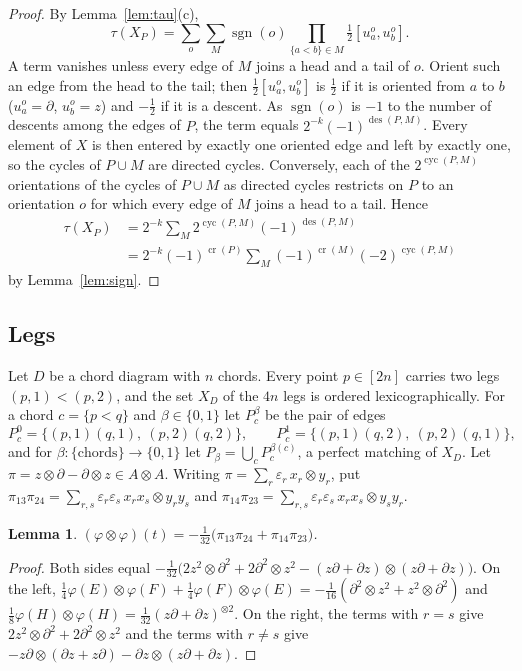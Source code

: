 \documentclass[preprint,12pt]{elsarticle}
\newtheorem{lemma}[theorem]{Lemma}
\theoremstyle{definition}
\newcommand{\cro}{\operatorname{cr}}
\newcommand{\cyc}{\operatorname{cyc}}
\newcommand{\des}{\operatorname{des}}
\newcommand{\dd}{\partial}
\begin{document}
\begin{proof}
By Lemma~\ref{lem:tau}(c),
\[
\tau(X_P)=\sum_o\sum_M\operatorname{sgn}(o)\prod_{\{a<b\}\in M}\tfrac12[u^o_a,u^o_b].
\]
A term vanishes unless every edge of $M$ joins a head and a tail of $o$. Orient such an edge from the head to the tail; then $\frac12[u^o_a,u^o_b]$ is $\frac12$ if it is oriented from $a$ to $b$ ($u^o_a=\dd$, $u^o_b=z$) and $-\frac12$ if it is a descent. As $\operatorname{sgn}(o)$ is $-1$ to the number of descents among the edges of $P$, the term equals $2^{-k}(-1)^{\des(P,M)}$. Every element of $X$ is then entered by exactly one oriented edge and left by exactly one, so the cycles of $P\cup M$ are directed cycles. Conversely, each of the $2^{\cyc(P,M)}$ orientations of the cycles of $P\cup M$ as directed cycles restricts on $P$ to an orientation $o$ for which every edge of $M$ joins a head to a tail. Hence
\begin{align*}
\tau(X_P)&=2^{-k}\sum_M2^{\cyc(P,M)}(-1)^{\des(P,M)}\\
&=2^{-k}(-1)^{\cro(P)}\sum_M(-1)^{\cro(M)}(-2)^{\cyc(P,M)}
\end{align*}
by Lemma~\ref{lem:sign}.
\end{proof}

\subsection{Legs}
Let $D$ be a chord diagram with $n$ chords. Every point $p\in[2n]$ carries two legs $(p,1)<(p,2)$, and the set $X_D$ of the $4n$ legs is ordered lexicographically. For a chord $c=\{p<q\}$ and $\beta\in\{0,1\}$ let $P_c^\beta$ be the pair of edges
\[
P_c^0=\{(p,1)(q,1),\ (p,2)(q,2)\},\qquad P_c^1=\{(p,1)(q,2),\ (p,2)(q,1)\},
\]
and for $\beta\colon\{\text{chords}\}\to\{0,1\}$ let $P_\beta=\bigcup_cP_c^{\beta(c)}$, a perfect matching of $X_D$. Let $\pi=z\otimes\dd-\dd\otimes z\in A\otimes A$. Writing $\pi=\sum_r\varepsilon_r\,x_r\otimes y_r$, put $\pi_{13}\pi_{24}=\sum_{r,s}\varepsilon_r\varepsilon_s\,x_rx_s\otimes y_ry_s$ and $\pi_{14}\pi_{23}=\sum_{r,s}\varepsilon_r\varepsilon_s\,x_rx_s\otimes y_sy_r$.

\begin{lemma}\label{lem:pi}
$(\varphi\otimes\varphi)(t)=-\frac{1}{32}\bigl(\pi_{13}\pi_{24}+\pi_{14}\pi_{23}\bigr)$.
\end{lemma}

\begin{proof}
Both sides equal $-\frac1{32}\bigl(2z^2\otimes\dd^2+2\dd^2\otimes z^2-(z\dd+\dd z)\otimes(z\dd+\dd z)\bigr)$. On the left, $\frac14\varphi(E)\otimes\varphi(F)+\frac14\varphi(F)\otimes\varphi(E)=-\frac1{16}(\dd^2\otimes z^2+z^2\otimes\dd^2)$ and $\frac18\varphi(H)\otimes\varphi(H)=\frac1{32}(z\dd+\dd z)^{\otimes2}$. On the right, the terms with $r=s$ give $2z^2\otimes\dd^2+2\dd^2\otimes z^2$ and the terms with $r\ne s$ give $-z\dd\otimes(\dd z+z\dd)-\dd z\otimes(z\dd+\dd z)$.
\end{proof}
\end{document}
